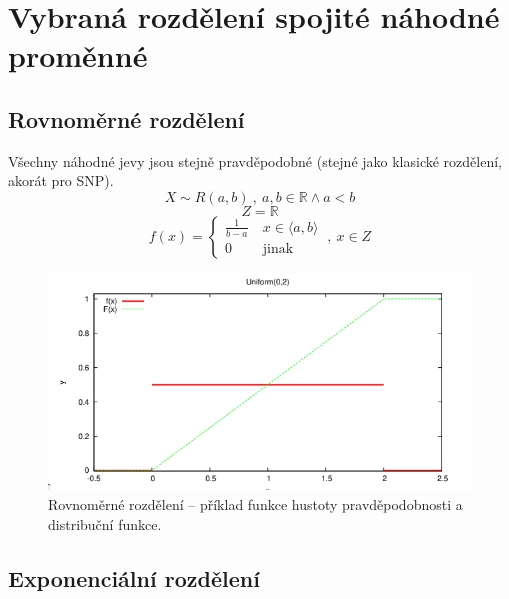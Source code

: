 
\section{Vybraná rozdělení spojité náhodné proměnné}

\subsection{Rovnoměrné rozdělení}

\begin{compactitem}
    \item Všechny náhodné jevy jsou stejně pravděpodobné (stejné jako klasické rozdělení, akorát pro SNP).
    $$ X \sim R(a, b) ~,~ a, b \in \mathbb{R} \land a < b $$
    $$ Z = \mathbb{R} $$
    $$ f(x) = \left\{
        \begin{array}{ll}
            \frac{1}{b-a} ~ & x \in \langle a, b \rangle \\
            0             ~ & \text{jinak}
        \end{array}
        \right. ~,~ x \in Z
    $$
\end{compactitem}

\begin{figure}[H]
    \centering
    \includegraphics[width=1\linewidth]{snp_rovnomerne.png}
    \caption{Rovnoměrné rozdělení -- příklad funkce hustoty pravděpodobnosti a distribuční funkce.}
\end{figure}

\subsection{Exponenciální rozdělení}

